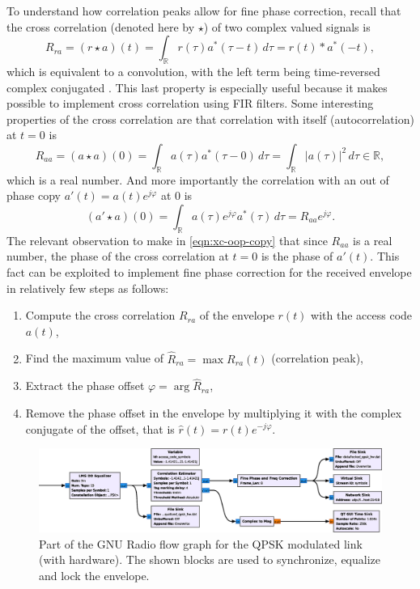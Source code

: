 To understand how correlation peaks allow for fine phase correction, recall that the cross correlation (denoted here by \(\star\)) of two complex valued signals is
\begin{equation}
	R_{ra}
	= (r \star a)(t)
	= \int_\mathbb{R} r(\tau) a^*(\tau - t) \,d\tau
	= r(t) * a^*(-t),
\end{equation}
which is equivalent to a convolution, with the left term being time-reversed complex conjugated \cite{Gallager}. This last property is especially useful because it makes possible to implement cross correlation using FIR filters. Some interesting properties of the cross correlation are that correlation with itself (autocorrelation) at \(t = 0\) is
\begin{equation}
	R_{aa} = (a \star a)(0)
	= \int_\mathbb{R} a(\tau) a^*(\tau - 0) \,d\tau
	= \int_\mathbb{R} |a(\tau)|^2 \,d\tau \in \mathbb{R},
\end{equation}
which is a real number. And more importantly the correlation with an out of phase copy \(a'(t) = a(t) e^{j\varphi}\) at 0 is
\begin{equation} \label{eqn:xc-oop-copy}
	(a' \star a)(0) 
	= \int_\mathbb{R} a(\tau)e^{j\varphi}  a^*(\tau) \,d\tau
	= R_{aa} e^{j\varphi}.
\end{equation}
The relevant observation to make in \eqref{eqn:xc-oop-copy} that since \(R_{aa}\) is a real number, the phase of the cross correlation at \(t = 0\) is the phase of \(a'(t)\). This fact can be exploited to implement fine phase correction for the received envelope in relatively few steps as follows:
\begin{enumerate}
	\item Compute the cross correlation \(R_{ra}\) of the envelope \(r(t)\) with the access code \(a(t)\),
	\item Find the maximum value of \(\hat{R}_{ra} = \max R_{ra}(t)\) (correlation peak),
	\item Extract the phase offset \(\varphi = \arg \hat{R}_{ra}\),
	\item Remove the phase offset in the envelope by multiplying it with the complex conjugate of the offset, that is \(\hat{r}(t) = r(t) e^{-j\varphi}\).
\end{enumerate}

\begin{figure}
	\centering
	\includegraphics[width = .95\linewidth]{figures/screenshots/sync_lock}
	\caption{
		Part of the GNU Radio flow graph for the QPSK modulated link (with hardware). The shown blocks are used to synchronize, equalize and lock the envelope.
		\label{fig:sync-lock-flowgraph}
	}
\end{figure}

